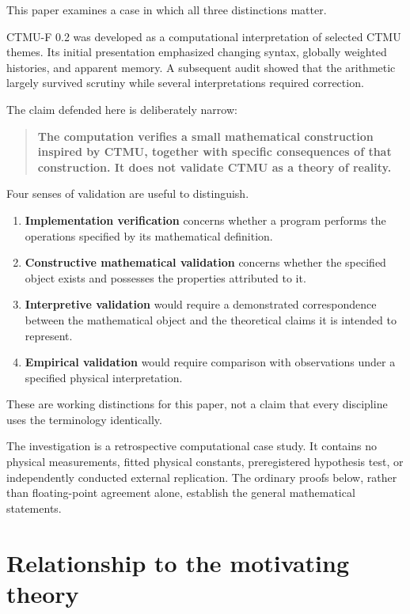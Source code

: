 \documentclass[11pt]{article}
\theoremstyle{remark}
\begin{document}
This paper examines a case in which all three distinctions matter.

CTMU-F 0.2 was developed as a computational interpretation of selected CTMU themes. Its initial presentation emphasized changing syntax, globally weighted histories, and apparent memory. A subsequent audit showed that the arithmetic largely survived scrutiny while several interpretations required correction.

The claim defended here is deliberately narrow:

\begin{quote}
\textbf{The computation verifies a small mathematical construction inspired by CTMU, together with specific consequences of that construction. It does not validate CTMU as a theory of reality.}
\end{quote}

Four senses of validation are useful to distinguish.

\begin{enumerate}
\item \textbf{Implementation verification} concerns whether a program performs the operations specified by its mathematical definition.
\item \textbf{Constructive mathematical validation} concerns whether the specified object exists and possesses the properties attributed to it.
\item \textbf{Interpretive validation} would require a demonstrated correspondence between the mathematical object and the theoretical claims it is intended to represent.
\item \textbf{Empirical validation} would require comparison with observations under a specified physical interpretation.
\end{enumerate}

These are working distinctions for this paper, not a claim that every discipline uses the terminology identically.

The investigation is a retrospective computational case study. It contains no physical measurements, fitted physical constants, preregistered hypothesis test, or independently conducted external replication. The ordinary proofs below, rather than floating-point agreement alone, establish the general mathematical statements.

\section{Relationship to the motivating theory}
\end{document}
